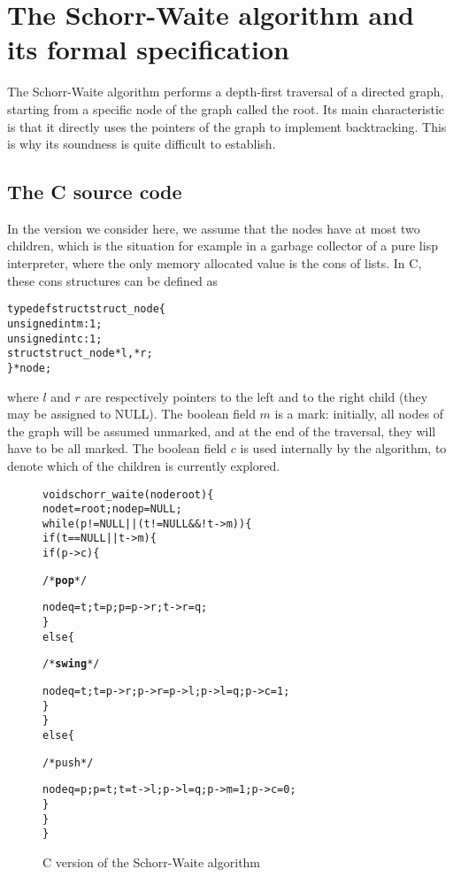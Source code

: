 
\section{The Schorr-Waite algorithm and its formal specification}
\label{sec:algo}

The Schorr-Waite algorithm performs a depth-first traversal of a
directed graph, starting from a specific node of the graph called the
root. Its main characteristic is that it directly uses the pointers of
the graph to implement backtracking. This is why its soundness is
quite difficult to establish. 

\subsection{The C source code}

In the version we consider here, we assume that the nodes have
at most two children, which is the situation for example in a garbage
collector of a pure lisp interpreter, where the only memory allocated
value is the \textsf{cons} of lists. In C, these \textsf{cons}
structures can be defined as
\begin{alltt}
typedef struct struct_node \{
  unsigned int m :1;
  unsigned int c :1;
  struct struct_node *l, *r;
\} * node;
\end{alltt}
where $l$ and $r$ are respectively pointers to the left and to the
right child (they may be assigned to NULL). The boolean field $m$ is a
mark: initially, all nodes of the graph will be assumed unmarked, and
at the end of the traversal, they will have to be all marked. The
boolean field $c$ is used internally by the algorithm, to denote which
of the children is currently explored.
 
\begin{figure}[b]
\hrulefill
\begin{alltt}
void schorr_waite(node root) \{
  node t = root; node p = NULL;
  while (p != NULL || (t != NULL && ! t->m)) \{
    if (t == NULL || t->m) \{
      if (p->c) \{ \begin{slshape}/* \textbf{pop} */\end{slshape}
        node q = t; t = p; p = p->r; t->r = q;
      \} 
      else \{ \begin{slshape}/* \textbf{swing} */\end{slshape}
        node q = t; t = p->r; p->r = p->l; p->l = q; p->c = 1;
      \}
    \} 
    else \{ \begin{slshape}/* push */ \end{slshape}
      node q = p; p = t; t = t->l; p->l = q; p->m = 1; p->c = 0;
    \}
  \}
\}
\end{alltt}
\vspace*{-5mm}
\caption{C version of the Schorr-Waite algorithm}
\label{fig:code}
\end{figure}

